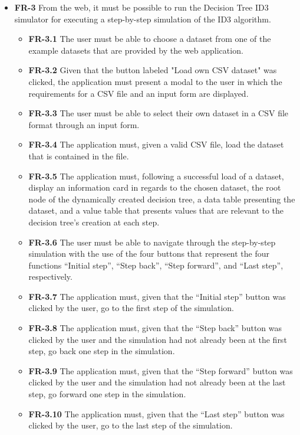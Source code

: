 \begin{itemize}
    \item \textbf{FR-3} From the web, it must be possible to run the Decision Tree ID3 simulator for executing a step-by-step simulation of the ID3 algorithm.
    \begin{itemize}
        \item \textbf{FR-3.1} The user must be able to choose a dataset from one of the example datasets that are provided by the web application.
        \item \textbf{FR-3.2} Given that the button labeled "Load own CSV dataset" was clicked, the application must present a modal to the user in which the requirements for a CSV file and an input form are displayed.
        \item \textbf{FR-3.3} The user must be able to select their own dataset in a CSV file format through an input form.
        \item \textbf{FR-3.4} The application must, given a valid CSV file, load the dataset that is contained in the file.
        \item \textbf{FR-3.5} The application must, following a successful load of a dataset, display an information card in regards to the chosen dataset, the root node of the dynamically created decision tree, a data table presenting the dataset, and a value table that presents values that are relevant to the decision tree's creation at each step.
        \item \textbf{FR-3.6} The user must be able to navigate through the step-by-step simulation with the use of the four buttons that represent the four functions ``Initial step'', ``Step back'', ``Step forward'', and ``Last step'', respectively.
        \item \textbf{FR-3.7} The application must, given that the ``Initial step'' button was clicked by the user, go to the first step of the simulation.
        \item \textbf{FR-3.8} The application must, given that the ``Step back'' button was clicked by the user and the simulation had not already been at the first step, go back one step in the simulation.
        \item \textbf{FR-3.9} The application must, given that the ``Step forward'' button was clicked by the user and the simulation had not already been at the last step, go forward one step in the simulation.
        \item \textbf{FR-3.10} The application must, given that the ``Last step'' button was clicked by the user, go to the last step of the simulation.
    \end{itemize}
\end{itemize}

